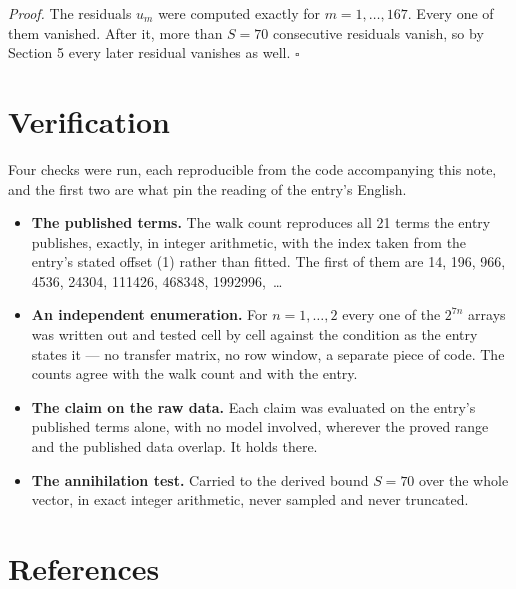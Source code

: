 \documentclass[11pt]{article}
\theoremstyle{definition}
\begin{document}
{\itshape Proof.} The residuals $u_m$ were computed exactly for $m = 1,\dots,167$. Every one of them vanished. After it, more than $S = 70$ consecutive residuals vanish, so by Section 5 every later residual vanishes as well. $\square$

\section{Verification}

Four checks were run, each reproducible from the code accompanying this note, and the first two are what pin the reading of the entry's English.

\begin{itemize}

\item {\bfseries The published terms.} The walk count reproduces all 21 terms the entry publishes, exactly, in integer arithmetic, with the index taken from the entry's stated offset (1) rather than fitted. The first of them are 14, 196, 966, 4536, 24304, 111426, 468348, 1992996,~\dots

\item {\bfseries An independent enumeration.} For $n = 1,\dots,2$ every one of the $2^{7n}$ arrays was written out and tested cell by cell against the condition as the entry states it --- no transfer matrix, no row window, a separate piece of code. The counts agree with the walk count and with the entry.

\item {\bfseries The claim on the raw data.} Each claim was evaluated on the entry's published terms alone, with no model involved, wherever the proved range and the published data overlap. It holds there.

\item {\bfseries The annihilation test.} Carried to the derived bound $S = 70$ over the whole vector, in exact integer arithmetic, never sampled and never truncated.

\end{itemize}

\section{References}
\end{document}
